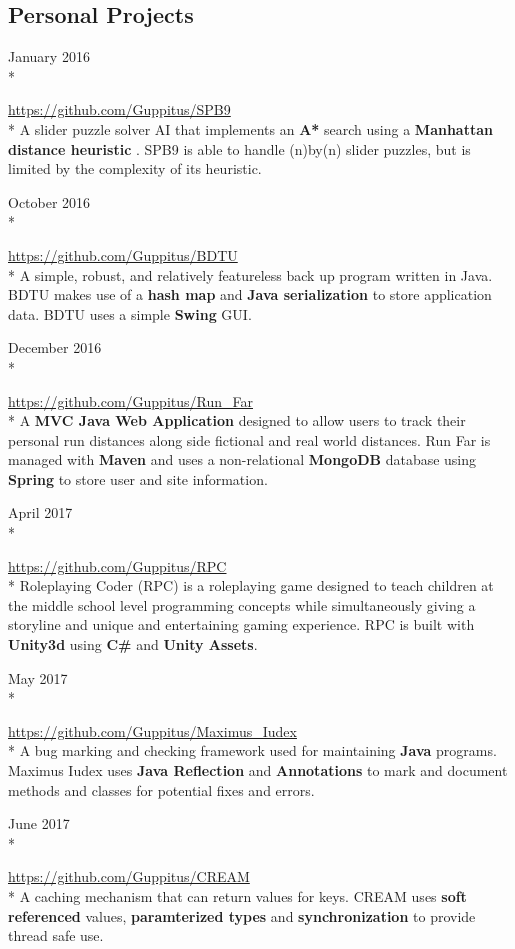 \documentclass[a4paper,margin,line]{resume}
\newcommand{\rurl}[1]{\hfill {\footnotesize \url{#1}}}
\newcommand{\rdate}[1]{\hfill {\small #1}}
\newcommand{\rproject}[4]{\item[#1] \hfill \rdate{#2} \\* \hfill \rdate{#3} \strut\hfill \rurl{#4} \\*}
\begin{document}
\begin{resume}
\section{\mysidestyle Personal Projects}
    \begin{asparadesc}
        	
        \rproject{SPB9}{January 2016}{}{https://github.com/Guppitus/SPB9}
        \small
        A slider puzzle solver AI that implements an {\bf A*} search using a {\bf Manhattan distance heuristic }. SPB9 is able to handle (n)by(n) slider puzzles, but is limited by the complexity of its heuristic.
        \normalsize
        \\
        
        \rproject{BDTU}{October 2016}{}{https://github.com/Guppitus/BDTU}
        \small
        A simple, robust, and relatively featureless back up program written in Java. BDTU makes use of a {\bf hash map} and {\bf Java serialization } to store application data. BDTU uses a simple {\bf Swing} GUI. 
        \normalsize
        \\
        
        \rproject{Run Far}{December 2016}{}{https://github.com/Guppitus/Run_Far}
        \small
        A {\bf MVC Java Web Application} designed to allow users to track their personal run distances along side fictional and real world distances. Run Far is managed with {\bf Maven} and uses a non-relational {\bf MongoDB} database using {\bf Spring} to store user and site information. 
        \normalsize
        \\
        
        \rproject{RPC}{April 2017}{}{https://github.com/Guppitus/RPC}
        \small
        Roleplaying Coder (RPC) is a roleplaying game designed to teach children at the middle school level programming concepts while simultaneously giving a storyline and unique and entertaining gaming experience. RPC is built with {\bf Unity3d} using {\bf C\#} and {\bf Unity Assets}.  
	\normalsize
	\\

	\rproject{Maximus Iudex}{May 2017}{}{https://github.com/Guppitus/Maximus_Iudex}
	\small
	A bug marking and checking framework used for maintaining {\bf Java} programs. Maximus Iudex uses {\bf Java Reflection} and {\bf Annotations} to mark and document methods and classes for potential fixes and errors.
	\normalsize
	\\

	\rproject{CREAM}{June 2017}{}{https://github.com/Guppitus/CREAM}
	\small
	A caching mechanism that can return values for keys. CREAM uses {\bf soft referenced} values, {\bf  paramterized types} and {\bf synchronization} to provide thread safe use.
	

\end{asparadesc}
\end{resume}
\end{document}
